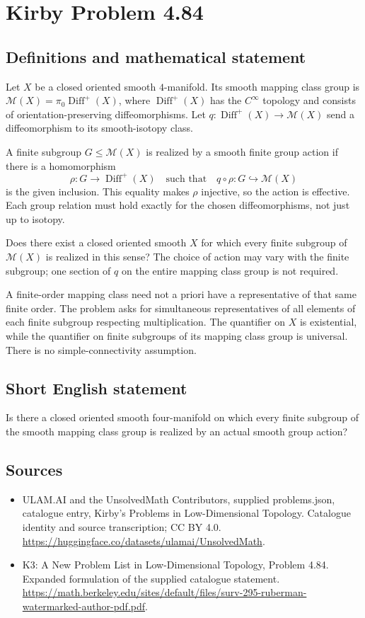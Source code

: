 \documentclass[11pt,a4paper]{article}
\begin{document}
\section*{Kirby Problem 4.84}\label{statement}

\subsection{Definitions and mathematical statement}
Let $X$ be a closed oriented smooth $4$-manifold. Its smooth
mapping class group is
$\mathcal M(X)=\pi_0\operatorname{Diff}^+(X)$, where
$\operatorname{Diff}^+(X)$ has the $C^\infty$ topology and consists
of orientation-preserving diffeomorphisms. Let
$q:\operatorname{Diff}^+(X)\to\mathcal M(X)$ send a diffeomorphism
to its smooth-isotopy class.

A finite subgroup $G\le\mathcal M(X)$ is realized by a smooth
finite group action if there is a homomorphism
\[
 \rho:G\longrightarrow\operatorname{Diff}^+(X)
       \quad\text{such that}\quad q\circ\rho:G\hookrightarrow\mathcal M(X)
\]
is the given inclusion. This equality makes $\rho$ injective,
so the action is effective. Each group relation must hold exactly
for the chosen diffeomorphisms, not just up to isotopy.

Does there exist a closed oriented smooth $X$ for which every
finite subgroup of $\mathcal M(X)$ is realized in this sense?
The choice of action may vary with the finite subgroup; one
section of $q$ on the entire mapping class group is not required.

A finite-order mapping class need not a priori have a representative
of that same finite order. The problem asks for simultaneous
representatives of all elements of each finite subgroup respecting
multiplication. The quantifier on $X$ is existential, while the
quantifier on finite subgroups of its mapping class group is
universal. There is no simple-connectivity assumption.
\subsection{Short English statement}
Is there a closed oriented smooth four-manifold on which every finite subgroup of the smooth mapping class group is realized by an actual smooth group action?
\subsection{Sources}
\begin{itemize}
\item[S1] ULAM.AI and the UnsolvedMath Contributors, supplied problems.json, catalogue entry, Kirby's Problems in Low-Dimensional Topology. Catalogue identity and source transcription; CC BY 4.0.
\url{https://huggingface.co/datasets/ulamai/UnsolvedMath}.
\item[S2] K3: A New Problem List in Low-Dimensional Topology, Problem 4.84. Expanded formulation of the supplied catalogue statement.
\url{https://math.berkeley.edu/sites/default/files/surv-295-ruberman-watermarked-author-pdf.pdf}.
\end{itemize}
\end{document}
